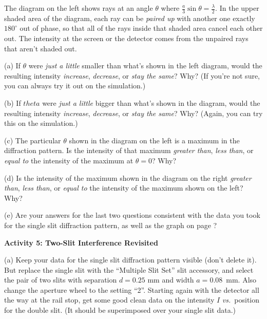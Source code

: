The diagram on the left shows rays at an angle $\theta$ where $\frac{a}{3} \sin \theta = \frac{\lambda}{2}$.  In the upper shaded area of the diagram, each ray can be \textit{paired up} with another one exactly $180^{\circ}$ out of phase, so that all of the rays inside that shaded area cancel each other out.  The intensity at the screen or the detector  comes from the unpaired rays that aren't shaded out.

(a) If $\theta$ were \textit{just a little} smaller than what's shown in the left diagram, would the resulting intensity \textit{increase}, \textit{decrease}, or \textit{stay the same}?  Why?  (If you're not sure, you can always try it out on the simulation.)
\answerspace{0.4in}

(b) If $theta$ were \textit{just a little} bigger than what's shown in the diagram, would the resulting intensity \textit{increase}, \textit{decrease}, or \textit{stay the same}?  Why?  (Again, you can try this on the simulation.)
\answerspace{0.4in}

(c) The particular $\theta$ shown in the diagram on the left is a maximum in the diffraction pattern.  Is the intensity of that maximum \textit{greater than}, \textit{less than}, or \textit{equal to} the intensity of the maximum at $\theta = 0$?  Why?
\answerspace{0.4in}

\pagebreak[2]
(d) Is the intensity of the maximum shown in the diagram on the right \textit{greater than}, \textit{less than}, or \textit{equal to} the intensity of the maximum shown on the left?  Why?  
\answerspace{0.4in}

(e) Are your answers for the last two questions consistent with the data you took for the single slit diffraction pattern, as well as the graph on page \pageref{fraunhofer_graph}?
\answerspace{0.4in}


\pagebreak[2]
\medskip
\textbf{Activity 5: Two-Slit Interference Revisited}

(a) Keep your data for the single slit diffraction pattern visible (don't delete it).  But replace the single slit with the ``Multiple Slit Set'' slit accessory, and select the pair of two slits with separation $d=0.25$ mm and width $a=0.08$~mm.  Also change the aperture wheel to the setting ``2''.  Starting again with the detector all the way at the rail stop, get some good clean data on the intensity $I$ \textit{vs.}~position for the double slit.  (It should be superimposed over your single slit data.)

